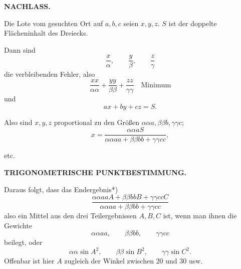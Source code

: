 \par\clearpage
\noindent{}\hfill{\small\textbf{NACHLASS.}}\hfill\null\par\medskip

Die Lote vom gesuchten Ort auf \(a,b,c\) seien \(x,y,z\). \(S\) ist der doppelte Flächeninhalt des Dreiecks.

Dann sind
\[
 \frac{x}{\alpha},\qquad \frac{y}{\beta},\qquad \frac{z}{\gamma}
\]
\noindent die verbleibenden Fehler, also
\[
 \frac{xx}{\alpha\alpha}+\frac{yy}{\beta\beta}+\frac{zz}{\gamma\gamma}
 \quad\text{Minimum}
\]
\noindent und
\[
 ax+by+cz=S.
\]

Also sind \(x,y,z\) proportional zu den Größen \(\alpha\alpha a,\beta\beta b,\gamma\gamma c\);
\[
 x=\frac{\alpha\alpha aS}{\alpha\alpha aa+\beta\beta bb+\gamma\gamma cc},
\]
{\centering etc.\par}

\]

\par\clearpage
\noindent\null\hfill{\small\textbf{TRIGONOMETRISCHE PUNKTBESTIMMUNG.}}\hfill{}\par\medskip

Daraus folgt, dass das Endergebnis*)
\[
 \frac{\alpha\alpha aaA+\beta\beta bbB+\gamma\gamma ccC}
      {\alpha\alpha aa+\beta\beta bb+\gamma\gamma cc}
\]
\noindent also ein Mittel aus den drei Teilergebnissen \(A,B,C\) ist, wenn man ihnen die Gewichte
\[
 \alpha\alpha aa,\qquad \beta\beta bb,\qquad \gamma\gamma cc
\]
\noindent beilegt, oder
\[
 \alpha\alpha\sin A^2,\qquad
 \beta\beta\sin B^2,\qquad
 \gamma\gamma\sin C^2.
\]
Offenbar ist hier \(A\) zugleich der Winkel zwischen \(20\) und \(30\) usw.

